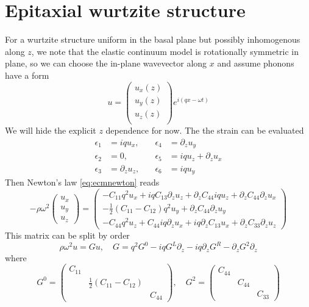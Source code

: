 \documentclass{article}
\begin{document}
\section{Epitaxial wurtzite structure}
For a wurtzite structure uniform in the basal plane but possibly inhomogenous along $z$, we note that the elastic continuum model is rotationally symmetric in plane, so we can choose the in-plane wavevector along $x$ and assume phonons have a form
\begin{equation}
  u = \begin{pmatrix}
    u_x(z)\\
    u_y(z)\\
    u_z(z)\\
  \end{pmatrix} e^{i(q x-\omega t)}
\end{equation}
We will hide the explicit $z$ dependence for now. The the strain can be evaluated
\begin{align}
  \epsilon_1&=iq u_x ,& \quad \epsilon_4&=\partial_z u_y \\
  \epsilon_2&=0 ,& \quad \epsilon_5&=iqu_z+\partial_z u_x \\
  \epsilon_3&=\partial_zu_z ,& \quad \epsilon_6&=iqu_y
\end{align}
Then Newton's law \eqref{eq:ecmnewton} reads 
\begin{equation}
  -\rho\omega^2\begin{pmatrix}
    u_x\\
    u_y\\
    u_z
  \end{pmatrix}=
  \begin{pmatrix}
    -C_{11}q^2u_x + iqC_{13}\partial_zu_z + \partial_zC_{44}iq u_z+\partial_zC_{44}\partial_zu_x  \\
    -\frac{1}{2}\left( C_{11}-C_{12} \right)q^2u_y +\partial_z C_{44}\partial_z u_y\\
  -C_{44}q^2u_z+C_{44}iq\partial_z u_x+iq\partial_zC_{13}u_x+\partial_zC_{33}\partial_zu_z
  \end{pmatrix}
\end{equation}
This matrix can be split by order
\begin{equation}
  \rho\omega^2u=
  Gu, \quad G= q^2G^0 -iq G^L\partial_z -iq \partial_z G^R  - \partial_z G^2 \partial_z
  \label{eq:split}
\end{equation}
where
\begin{equation}
  G^0= \begin{pmatrix}
    C_{11} &  & \\
    & \frac{1}{2}\left( C_{11}-C_{12} \right) & \\
    & & C_{44}
  \end{pmatrix}, \quad
  G^2= \begin{pmatrix}
    C_{44} &  & \\
    & C_{44} & \\
    & & C_{33}
  \end{pmatrix}
\end{equation}
\end{document}
